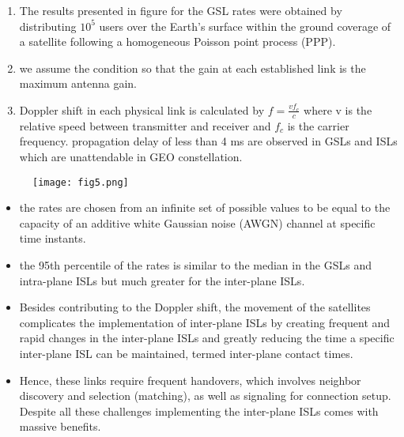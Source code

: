 \documentclass{beamer}
\begin{document}
\begin{frame}
\begin{enumerate}
    \item The results presented in figure 
for the GSL rates were obtained by distributing $10^5$ users over the Earth's surface within the ground coverage of a satellite following a homogeneous Poisson point process (PPP).
   \item  we assume the condition so that the gain
at each established link is the maximum antenna gain.
\item Doppler shift in each physical link is calculated by 
 $f = \frac{v f_{c}}{c} $ where v is the relative speed between transmitter and receiver and $f_c$ is the carrier frequency.
 propagation delay of less than 4 ms are observed in GSLs and ISLs which are unattendable in GEO constellation.
\end{enumerate}
\end{frame}

\begin{frame}
  \begin{figure}
    \centering
    \texttt{[image: fig5.png]}
\end{figure}  
\end{frame}

\begin{frame}
\begin{itemize}
    \item the rates are
chosen from an infinite set of possible values to be equal to the capacity of an additive white Gaussian noise (AWGN) channel at specific time instants.
\item the 95th percentile of
the rates is similar to the median in the GSLs and intra-plane
ISLs but much greater for the inter-plane ISLs.
\item Besides contributing to the Doppler shift, the movement of
the satellites complicates the implementation of inter-plane
ISLs by creating frequent and rapid changes in the inter-plane
ISLs and greatly reducing the time a specific inter-plane ISL
can be maintained, termed inter-plane contact times.
\item Hence, these links require frequent handovers, which involves neighbor discovery and selection (matching), as well as signaling
for connection setup.
Despite all these challenges implementing the inter-plane  ISLs comes with massive benefits. 
\end{itemize}    
\end{frame}
\end{document}
